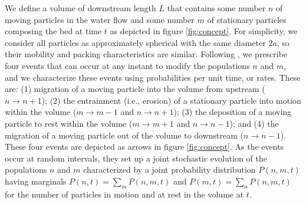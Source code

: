 \documentclass[draft]{agujournal2018}
\begin{document}

We define a volume of downstream length $L$ that contains some number $n$ of moving particles in the water flow and some number $m$ of stationary particles composing the bed at time $t$ as depicted in figure \ref{fig:concept}.
For simplicity, we consider all particles as approximately spherical with the same diameter $2a$, so their mobility and packing characteristics are similar.
Following \citet{Ancey2008}, we prescribe four events that can occur at any instant to modify the populations $n$ and $m$, and we characterize these events using probabilities per unit time, or rates.
These are: (1) migration of a moving particle into the volume from upstream ($n \rightarrow n+1$); (2) the entrainment (i.e., erosion) of a stationary particle into motion within the volume ($m\rightarrow m-1$ and $n\rightarrow n+1$); (3) the deposition of a moving particle to rest within the volume ($m\rightarrow m+1$ and $n\rightarrow n-1$); and (4) the migration of a moving particle out of the volume to downstream ($n\rightarrow n-1$).
These four events are depicted as arrows in figure \ref{fig:concept}.
As the events occur at random intervals, they set up a joint stochastic evolution of the populations $n$ and $m$ characterized by a joint probability distribution $P(n,m,t)$ having marginals $P(n,t) = \sum_m P(n,m,t)$ and $P(m,t) = \sum_n P(n,m,t)$ for the number of particles in motion and at rest in the volume at $t$.
\end{document}
